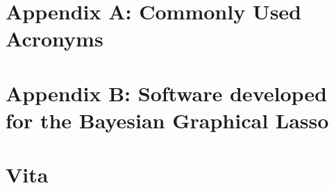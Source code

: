 \documentclass[final]{ulthesis}
\begin{document}
\chapter{Appendix A: Commonly Used Acronyms}


\chapter{Appendix B: Software developed for the Bayesian Graphical Lasso}


\chapter{Vita}
\begin{DoubleSpace*}

\end{DoubleSpace*}
\end{document}
